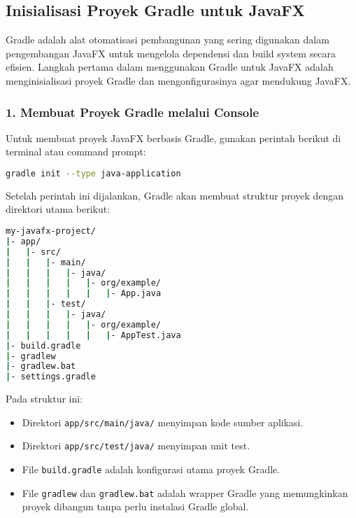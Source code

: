 \subsection{Inisialisasi Proyek Gradle untuk JavaFX}
\label{gradle_javafx}

Gradle adalah alat otomatisasi pembangunan yang sering digunakan dalam pengembangan JavaFX untuk mengelola dependensi dan build system secara efisien. Langkah pertama dalam menggunakan Gradle untuk JavaFX adalah menginisialisasi proyek Gradle dan mengonfigurasinya agar mendukung JavaFX.

\subsubsection{1. Membuat Proyek Gradle melalui Console}

Untuk membuat proyek JavaFX berbasis Gradle, gunakan perintah berikut di terminal atau command prompt:

\begin{lstlisting}[language=bash, caption=Menginisialisasi proyek Gradle]
gradle init --type java-application
\end{lstlisting}

Setelah perintah ini dijalankan, Gradle akan membuat struktur proyek dengan direktori utama berikut:

\begin{lstlisting}[language=bash, caption=Struktur proyek Gradle setelah inisialisasi]
my-javafx-project/
|- app/
|   |- src/
|   |   |- main/
|   |   |   |- java/
|   |   |   |   |- org/example/
|   |   |   |   |   |- App.java
|   |   |- test/
|   |   |   |- java/
|   |   |   |   |- org/example/
|   |   |   |   |   |- AppTest.java
|- build.gradle
|- gradlew
|- gradlew.bat
|- settings.gradle
\end{lstlisting}


Pada struktur ini:
\begin{itemize}
\item Direktori \texttt{app/src/main/java/} menyimpan kode sumber aplikasi.
\item Direktori \texttt{app/src/test/java/} menyimpan unit test.
\item File \texttt{build.gradle} adalah konfigurasi utama proyek Gradle.
\item File \texttt{gradlew} dan \texttt{gradlew.bat} adalah wrapper Gradle yang memungkinkan proyek dibangun tanpa perlu instalasi Gradle global.
\end{itemize}

